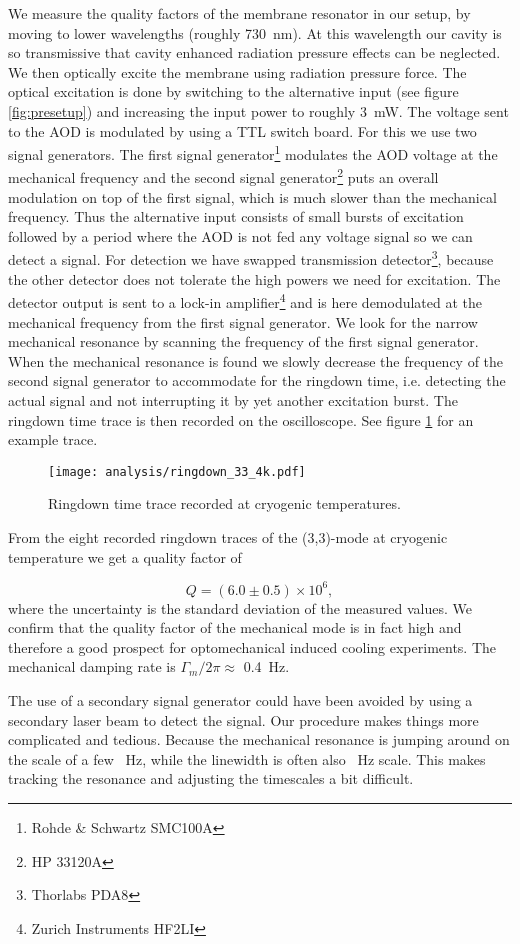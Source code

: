 We measure the quality factors of the membrane resonator in our setup, by moving to lower wavelengths (roughly \SI{730}{\nano\meter}). At this wavelength our cavity is so transmissive that  cavity enhanced radiation pressure effects can be neglected. We then optically excite the membrane using radiation pressure force. The optical excitation is done by switching to the alternative input (see figure \ref{fig:presetup}) and increasing the input power to roughly \SI{3}{\milli\watt}. The voltage sent to the AOD is modulated by using a TTL switch board. For this we use two signal generators. The first signal generator\footnote{Rohde \& Schwartz SMC100A} modulates the AOD voltage at the mechanical frequency and the second signal generator\footnote{HP 33120A} puts an overall modulation on top of the first signal, which is much slower than the mechanical frequency. Thus the alternative input consists of small bursts of excitation followed by a period where the AOD is not fed any voltage signal so we can detect a signal. For detection we have swapped transmission detector\footnote{Thorlabs PDA8}, because the other detector does not tolerate the high powers we need for excitation. The detector output is sent to a lock-in amplifier\footnote{Zurich Instruments HF2LI} and is here demodulated at the mechanical frequency from the first signal generator. We look for the narrow mechanical resonance by scanning the frequency of the first signal generator. When the mechanical resonance is found we slowly decrease the frequency of the second signal generator to accommodate for the ringdown time, i.e. detecting the actual signal and not interrupting it by yet another excitation burst. The ringdown time trace is then recorded on the oscilloscope. See figure \ref{fig:ringdown_trace} for an example trace.

\begin{figure}[h]
\centering
\texttt{[image: analysis/ringdown\_33\_4k.pdf]}
\caption{Ringdown time trace recorded at cryogenic temperatures.}
\label{fig:ringdown_trace}
\end{figure}

From the eight recorded ringdown traces of the (3,3)-mode at cryogenic temperature we get a quality factor of

\begin{equation}
Q = (6.0 \pm 0.5) \times 10^6,
\end{equation}
\noindent
where the uncertainty is the standard deviation of the measured values. We confirm that the quality factor of the mechanical mode is in fact high and therefore a good prospect for optomechanical induced cooling experiments. The mechanical damping rate is $\Gamma_m/2\pi \approx $ \SI{0.4}{\hertz}.

The use of a secondary signal generator could have been avoided by using a secondary laser beam to detect the signal. Our procedure makes things more complicated and tedious. Because the mechanical resonance is jumping around on the scale of a few \SI{}{\hertz}, while the linewidth is often also \SI{}{\hertz} scale. This makes tracking the resonance and adjusting the timescales a bit difficult.